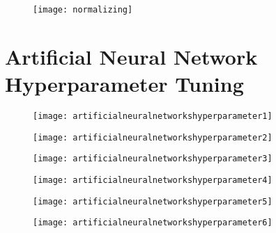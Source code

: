  	\begin{figure}[h]
		\centering
		\texttt{[image: normalizing]}
		\caption{}
		\label{fig:normalizing}
	\end{figure}

	\section{Artificial Neural Network Hyperparameter Tuning}

 	\begin{figure}[h]
		\centering
		\texttt{[image: artificialneuralnetworkshyperparameter1]}
		\caption{}
		\label{fig:artificialneuralnetworkshyperparameter1}
	\end{figure}
 	\begin{figure}[h]
		\centering
		\texttt{[image: artificialneuralnetworkshyperparameter2]}
		\caption{}
		\label{fig:artificialneuralnetworkshyperparameter2}
	\end{figure}
 	\begin{figure}[h]
		\centering
		\texttt{[image: artificialneuralnetworkshyperparameter3]}
		\caption{}
		\label{fig:artificialneuralnetworkshyperparameter3}
	\end{figure}
 	\begin{figure}[h]
		\centering
		\texttt{[image: artificialneuralnetworkshyperparameter4]}
		\caption{}
		\label{fig:artificialneuralnetworkshyperparameter4}
	\end{figure}
 	\begin{figure}[h]
		\centering
		\texttt{[image: artificialneuralnetworkshyperparameter5]}
		\caption{}
		\label{fig:artificialneuralnetworkshyperparameter5}
	\end{figure}
 	\begin{figure}[h]
		\centering
		\texttt{[image: artificialneuralnetworkshyperparameter6]}
		\caption{}
		\label{fig:artificialneuralnetworkshyperparameter6}
	\end{figure}
